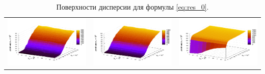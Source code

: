 \documentclass[12pt,a4paper]{article}
\theoremstyle{definition}
\begin{document}
\begin{table}[h]
\begin{tabular}{c c c}
	\includegraphics[scale=0.4]{figs/even/p1.txt_coeff2.dat.pdf} & \includegraphics[scale=0.4]{figs/even/p2.txt_coeff2.dat.pdf} & \includegraphics[scale=0.4]{figs/even/p3.txt_coeff2.dat.pdf}
  \end{tabular}
  \caption{Поверхности дисперсии для формулы \eqref{eq:res_0}.}
  \label{tabl:res_even}
\end{table}
\end{document}

